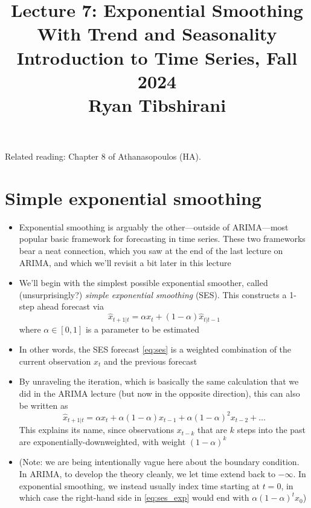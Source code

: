 \documentclass{article}
\title{Lecture 7: Exponential Smoothing With Trend and Seasonality \\ \smallskip
\large Introduction to Time Series, Fall 2024 \\ \smallskip
Ryan Tibshirani}
\date{}
\begin{document}
\maketitle
\RaggedRight
\vspace{-50pt}

Related reading: Chapter 8 of Athanasopoulos (HA).

\section{Simple exponential smoothing}

\begin{itemize}
\item Exponential smoothing is arguably the other---outside of ARIMA---most 
  popular basic framework for forecasting in time series. These two frameworks
  bear a neat connection, which you saw at the end of the last lecture on ARIMA,
  and which we'll revisit a bit later in this lecture

\item We'll begin with the simplest possible exponential smoother, called
  (unsurprisingly?) \emph{simple exponential smoothing} (SES). This constructs 
  a 1-step ahead forecast via
  \begin{equation}
  \label{eq:ses}
  \hat{x}_{t+1 | t }= \alpha x_t + (1-\alpha) \hat{x}_{t | t-1}
  \end{equation}
  where $\alpha \in [0,1]$ is a parameter to be estimated

\item In other words, the SES forecast \eqref{eq:ses} is a weighted combination 
  of the current observation $x_t$ and the previous forecast  

\item By unraveling the iteration, which is basically the same calculation that
  we did in the ARIMA lecture (but now in the opposite direction), this can also
  be written as    
  \begin{equation}
  \label{eq:ses_exp}
  \hat{x}_{t+1 | t} = \alpha x_t + \alpha (1-\alpha) x_{t-1} + \alpha
  (1-\alpha)^2 x_{t-2} + \dots
  \end{equation}
  This explains its name, since observations $x_{t-k}$ that are $k$ steps into 
  the past are exponentially-downweighted, with weight $(1-\alpha)^k$  

\item  (Note: we are being intentionally vague here about the boundary 
  condition. In ARIMA, to develop the theory cleanly, we let time extend back to
  $-\infty$. In  exponential smoothing, we instead usually index time starting
  at $t = 0$, in which case the right-hand side in \eqref{eq:ses_exp} would end
  with $\alpha (1-\alpha)^t x_0$)


\end{itemize}
\end{document}
